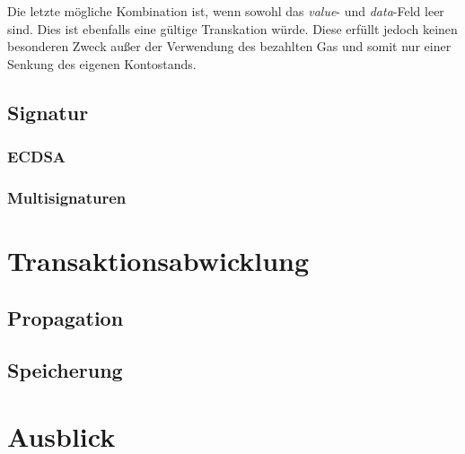 \documentclass[runningheads]{llncs}
\begin{document}
Die letzte mögliche Kombination ist, wenn sowohl das \textit{value}- und \textit{data}-Feld leer sind. Dies ist ebenfalls eine gültige Transkation würde. Diese erfüllt jedoch keinen besonderen Zweck außer der Verwendung des bezahlten Gas und somit nur einer Senkung des eigenen Kontostands.
\subsection{Signatur}

\subsubsection{ECDSA}
\label{ecdsa}

\subsubsection{Multisignaturen}

\section{Transaktionsabwicklung}

\subsection{Propagation}

\subsection{Speicherung}

\section{Ausblick}



\end{document}
